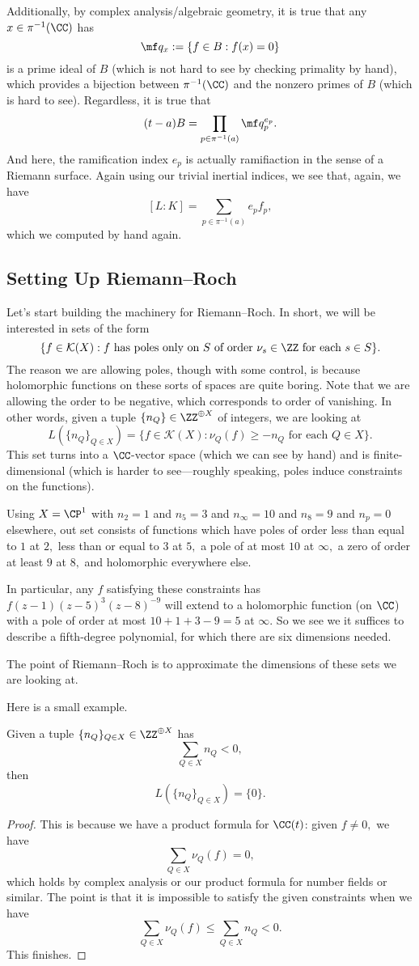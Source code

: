 \documentclass[../notes.tex]{subfiles}
\begin{document}
Additionally, by complex analysis/algebraic geometry, it is true that any $x\in\pi^{-1}(\CC)$ has
\[\mf q_x:=\{f\in B:f(x)=0\}\]
is a prime ideal of $B$ (which is not hard to see by checking primality by hand), which provides a bijection between $\pi^{-1}(\CC)$ and the nonzero primes of $B$ (which is hard to see). Regardless, it is true that
\[(t-a)B=\prod_{p\in\pi^{-1}(a)}\mf q_p^{e_p}.\]
And here, the ramification index $e_p$ is actually ramifiaction in the sense of a Riemann surface. Again using our trivial inertial indices, we see that, again, we have
\[[L:K]=\sum_{p\in\pi^{-1}(a)}e_pf_p,\]
which we computed by hand again.

\subsection{Setting Up Riemann--Roch}
Let's start building the machinery for Riemann--Roch. In short, we will be interested in sets of the form
\[\{f\in\mathcal K(X):f\text{ has poles only on }S\text{ of order }\nu_s\in\ZZ\text{ for each }s\in S\}.\]
The reason we are allowing poles, though with some control, is because holomorphic functions on these sorts of spaces are quite boring. Note that we are allowing the order to be negative, which corresponds to order of vanishing. In other words, given a tuple $\{n_Q\}\in\ZZ^{\oplus X}$ of integers, we are looking at
\[L(\{n_Q\}_{Q\in X})=\{f\in\mathcal K(X):\nu_Q(f)\ge-n_Q\text{ for each }Q\in X\}.\]
This set turns into a $\CC$-vector space (which we can see by hand) and is finite-dimensional (which is harder to see---roughly speaking, poles induce constraints on the functions).
\begin{example}
	Using $X=\CP^1$ with $n_2=1$ and $n_5=3$ and $n_\infty=10$ and $n_8=9$ and $n_p=0$ elsewhere, out set consists of functions which have poles of order less than equal to $1$ at $2,$ less than or equal to $3$ at $5,$ a pole of at most $10$ at $\infty,$ a zero of order at least $9$ at $8,$ and holomorphic everywhere else.

	In particular, any $f$ satisfying these constraints has $f(z-1)(z-5)^3(z-8)^{-9}$ will extend to a holomorphic function (on $\CC$) with a pole of order at most $10+1+3-9=5$ at $\infty.$ So we see we it suffices to describe a fifth-degree polynomial, for which there are six dimensions needed.
\end{example}
The point of Riemann--Roch is to approximate the dimensions of these sets we are looking at.

Here is a small example.
\begin{proposition}
	Given a tuple $\{n_Q\}_{Q\in X}\in\ZZ^{\oplus X}$ has
	\[\sum_{Q\in X}n_Q<0,\]
	then
	\[L(\{n_Q\}_{Q\in X})=\{0\}.\]
\end{proposition}
\begin{proof}
	This is because we have a product formula for $\CC(t)$: given $f\ne0,$ we have
	\[\sum_{Q\in X}\nu_Q(f)=0,\]
	which holds by complex analysis or our product formula for number fields or similar. The point is that it is impossible to satisfy the given constraints when we have
	\[\sum_{Q\in X}\nu_Q(f)\le\sum_{Q\in X}n_Q<0.\]
	This finishes.
\end{proof}
\end{document}
